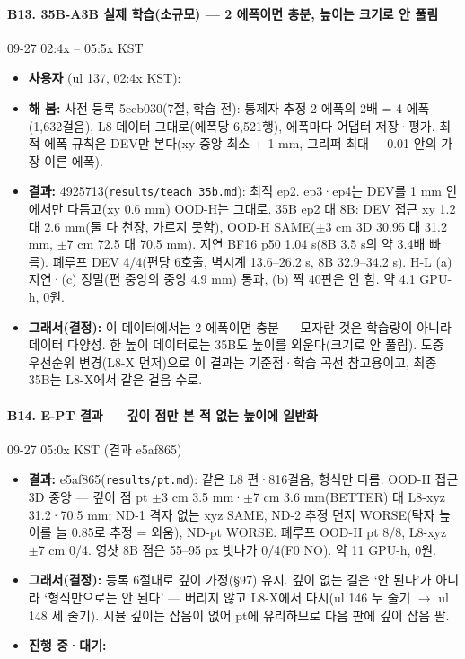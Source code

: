 \paragraph{B13. 35B-A3B 실제 학습(소규모) --- 2 에폭이면 충분, 높이는 크기로 안 풀림}
{\small 09-27 02:4x -- 05:5x KST}
\begin{itemize}
  \item \textbf{사용자} (ul 137, 02:4x KST): 
  \item \textbf{해 봄:} 사전 등록 5ecb030(7절, 학습 전): 통제자 추정 2 에폭의 2배 = 4 에폭(1,632걸음), L8 데이터 그대로(에폭당 6,521행), 에폭마다 어댑터 저장·평가. 최적 에폭 규칙은 DEV만 본다(xy 중앙 최소 + 1 mm, 그리퍼 최대 $-$ 0.01 안의 가장 이른 에폭).
  \item \textbf{결과:} 4925713(\texttt{results/\allowbreak{}teach\_\allowbreak{}35b.\allowbreak{}md}): 최적 ep2. ep3·ep4는 DEV를 1 mm 안에서만 다듬고(xy 0.6 mm) OOD-H는 그대로. 35B ep2 대 8B: DEV 접근 xy 1.2 대 2.6 mm(둘 다 천장, 가르지 못함), OOD-H SAME($\pm$3 cm 3D 30.95 대 31.2 mm, $\pm$7 cm 72.5 대 70.5 mm). 지연 BF16 p50 1.04 s(8B 3.5 s의 약 3.4배 빠름). 폐루프 DEV 4/4(편당 6호출, 벽시계 13.6--26.2 s, 8B 32.9--34.2 s). H-L (a) 지연·(c) 정밀(편 중앙의 중앙 4.9 mm) 통과, (b) 짝 40판은 안 함. 약 4.1 GPU-h, 0원.
  \item \textbf{그래서(결정):} 이 데이터에서는 2 에폭이면 충분 --- 모자란 것은 학습량이 아니라 데이터 다양성. 한 높이 데이터로는 35B도 높이를 외운다(크기로 안 풀림). 도중 우선순위 변경(L8-X 먼저)으로 이 결과는 기준점·학습 곡선 참고용이고, 최종 35B는 L8-X에서 같은 걸음 수로.
\end{itemize}

\paragraph{B14. E-PT 결과 --- 깊이 점만 본 적 없는 높이에 일반화}
{\small 09-27 05:0x KST (결과 e5af865)}
\begin{itemize}
  \item \textbf{결과:} e5af865(\texttt{results/\allowbreak{}pt.\allowbreak{}md}): 같은 L8 편·816걸음, 형식만 다름. OOD-H 접근 3D 중앙 --- 깊이 점 pt $\pm$3 cm 3.5 mm·$\pm$7 cm 3.6 mm(BETTER) 대 L8-xyz 31.2·70.5 mm; ND-1 격자 없는 xyz SAME, ND-2 추정 먼저 WORSE(탁자 높이를 늘 0.85로 추정 = 외움), ND-pt WORSE. 폐루프 OOD-H pt 8/8, L8-xyz $\pm$7 cm 0/4. 영샷 8B 점은 55--95 px 빗나가 0/4(F0 NO). 약 11 GPU-h, 0원.
  \item \textbf{그래서(결정):} 등록 6절대로 깊이 가정(§97) 유지. 깊이 없는 길은 `안 된다'가 아니라 `형식만으로는 안 된다' --- 버리지 않고 L8-X에서 다시(ul 146 두 줄기 $\rightarrow$ ul 148 세 줄기). 시뮬 깊이는 잡음이 없어 pt에 유리하므로 다음 판에 깊이 잡음 팔.
  \item \textbf{진행 중·대기:} 
\end{itemize}

